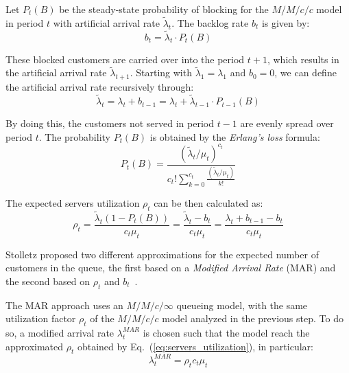 Let \( P_t(B) \) be the steady-state probability of blocking for the \( M/M/c/c \) model in period \( t \) with artificial arrival rate \( \widetilde{\lambda}_t \). The backlog rate \( b_t \) is given by:
\begin{equation}
  b_t = \widetilde{\lambda}_t \cdot P_t(B)
\end{equation}

These blocked customers are carried over into the period \( t+1 \), which results in the artificial arrival rate \( \widetilde{\lambda}_{t+1} \). Starting with \( \widetilde{\lambda}_1 = \lambda_1 \) and \( b_0 = 0 \), we can define the artificial arrival rate recursively through:
\begin{equation}
  \widetilde{\lambda}_t = \lambda_t + b_{t-1} = \lambda_t + \widetilde{\lambda}_{t-1} \cdot P_{t-1}(B)
\end{equation}

By doing this, the customers not served in period \( t-1 \) are evenly spread over period \( t \). The probability \( P_t(B) \) is obtained by the \emph{Erlang’s loss} formula:
\begin{equation}
  P_t(B) = \frac{(\widetilde{\lambda}_t / \mu_t)^{c_t}}{c_t!\sum_{k=0}^{c_t} \frac{(\widetilde{\lambda}_t / \mu_t)}{k!}}
\end{equation}

The expected servers utilization \( \rho_t \) can be then calculated as:
\begin{equation}
  \rho_t = \frac{\widetilde{\lambda}_t(1 - P_t(B))}{c_t\mu_t} = \frac{\widetilde{\lambda}_t - b_t}{c_t\mu_t} = \frac{\lambda_t + b_{t-1} - b_t}{c_t\mu_t}
  \label{eq:servers_utilization}
\end{equation}

Stolletz proposed two different approximations for the expected number of customers in the queue, the first based on a \emph{Modified Arrival Rate} (MAR) and the second based on \( \rho_t \) and \( b_t \)~\cite{stolletz}.

The MAR approach uses an \( M/M/c/\infty \) queueing model, with the same utilization factor \( \rho_t \) of the \( M/M/c/c \) model analyzed in the previous step. To do so, a modified arrival rate \( \lambda_t^{MAR} \) is chosen such that the model reach the approximated \( \rho_t \) obtained by Eq.~(\ref{eq:servers_utilization}), in particular:
\begin{equation}
  \lambda_t^{MAR} = \rho_t c_t \mu_t
\end{equation}

